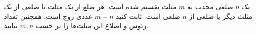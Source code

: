 \EXERCISE
یک
$n$
 ضلعی محدب به
$m$
مثلث تقسیم شده است. هر ضلع از یک مثلث یا ضلعی از یک مثلث دیگر یا ضلعی از
$n$
ضلعی است. ثابت کنید
$m + n$
عددی زوج است. همچنین تعداد رئوس و اضلاع این مثلث‌ها را بر حسب
$m, n$
بیابید.